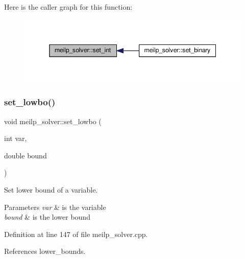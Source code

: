 Here is the caller graph for this function\+:
\nopagebreak
\begin{figure}[H]
\begin{center}
\leavevmode
\includegraphics[width=345pt]{dc/d7f/classmeilp__solver_aa9d0154f8daf67a0d815b76c6739546a_icgraph}
\end{center}
\end{figure}
\mbox{\label{classmeilp__solver_a3832e317cd19888528a0797f87f40051}} 
\subsubsection{\texorpdfstring{set\+\_\+lowbo()}{set\_lowbo()}}
{\footnotesize\ttfamily void meilp\+\_\+solver\+::set\+\_\+lowbo (\begin{DoxyParamCaption}\item[{int}]{var,  }\item[{double}]{bound }\end{DoxyParamCaption})\hspace{0.3cm}{\ttfamily [virtual]}}



Set lower bound of a variable. 


\begin{DoxyParams}{Parameters}
{\em var} & is the variable \\
\hline
{\em bound} & is the lower bound \\
\hline
\end{DoxyParams}


Definition at line 147 of file meilp\+\_\+solver.\+cpp.



References lower\+\_\+bounds.

\mbox{\label{classmeilp__solver_a40f8db00eeeeff115b97ffaf9511bab2}} 
